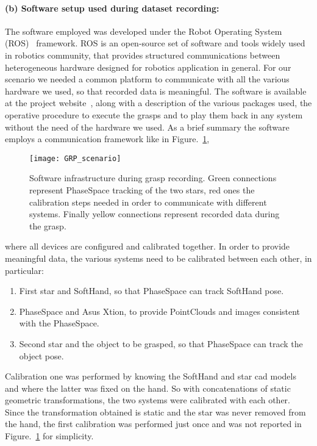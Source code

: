 \paragraph{(b) Software setup used during dataset recording:}
The software employed was developed under the Robot Operating System (ROS)~\cite{ROS} framework. ROS is an open-source set of software and tools widely used in robotics community,
that provides structured communications between heterogeneous hardware designed for robotics application in general.
For our scenario we needed a common platform to communicate with all the various hardware we used, so that recorded data is meaningful.
The software is available at the project website~\cite{website:pacman:dataset}, along with a description of the various packages used, the operative procedure to execute the grasps
and to play them back in any system without the need of the hardware we used. 
As a brief summary the software employs a communication framework like in Figure.~\ref{fig:grasp:software}, 
\begin{figure}[bt!]
  \centering
  \texttt{[image: GRP\_scenario]}
  \caption{Software infrastructure during grasp recording. Green connections represent PhaseSpace tracking of the two stars, red ones the calibration steps needed in order to communicate with different systems. Finally yellow connections represent recorded data during the grasp.}
  \label{fig:grasp:software}
\end{figure}
where all devices are configured and calibrated together. In order to provide meaningful data, the various systems need to be calibrated between each other, in particular: 
\begin{enumerate}
  \item First star and SoftHand, so that PhaseSpace can track SoftHand pose.
  \item PhaseSpace and Asus Xtion, to provide PointClouds and images consistent with the PhaseSpace.
  \item Second star and the object to be grasped, so that PhaseSpace can track the object pose.
\end{enumerate}
Calibration one was performed by knowing the SoftHand and star cad models and where the latter was fixed on the hand. So with concatenations of static geometric transformations, the two systems were calibrated with each other.
Since the transformation obtained is static and the star was never removed from the hand, the first calibration was performed just once and was not reported in Figure.~\ref{fig:grasp:software} for simplicity.
